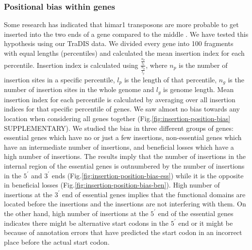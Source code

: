 \documentclass[12pt,letterpaper]{article}
\begin{document}
\subsubsection{Positional bias within genes}
Some research has indicated that himar1 transposons are more probable to get inserted into the two ends of a gene compared to the middle \cite{griffin_high-resolution_2011}. We have tested this hypothesis using our TraDIS data. We divided every gene into 100 fragments with equal lengths (percentiles) and calculated the mean insertion index for each percentile. Insertion index is calculated using $\frac{\frac{n_p}{l_p}}{\frac{n_g}{l_g}}$, where $n_p$ is the number of insertion sites in a specific percentile, $l_p$ is the length of that percentile, $n_g$ is the number of insertion sites in the whole genome and $l_g$ is genome length. Mean insertion index for each percentile is calculated by averaging over all insertion indices for that specific percentile of genes. We saw almost no bias towards any location when considering all genes together (Fig.\@ \ref{fig:insertion-position-bias} {\color{red}SUPPLEMENTARY}). We studied the bias in three different groups of genes: essential genes which have no or just a few insertions, non-essential genes which have an intermediate number of insertions, and beneficial losses which have a high number of insertions. The results imply that the number of insertions in the internal region of the essential genes is outnumbered by the number of insertions in the $5^\prime$ and $3^\prime$ ends (Fig.\@ \ref{fig:insertion-position-bias-ess}) while it is the opposite in beneficial losses (Fig.\@ \ref{fig:insertion-position-bias-ben}). High number of insertions at the $3^\prime$ end of essential genes implies that the functional domains are located before the insertions and the insertions are not interfering with them. On the other hand, high number of insertions at the $5^\prime$ end of the essential genes indicates there might be alternative start codons in the $5^\prime$ end or it might be because of annotation errors that have predicted the start codon in an incorrect place before the actual start codon.

\end{document}
